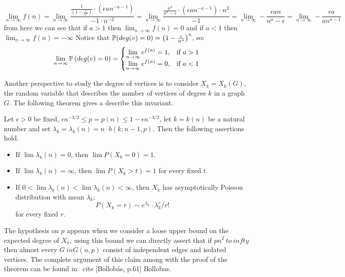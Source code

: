 $$\displaystyle\lim_{n\to \infty } f(n) = 
\displaystyle\lim_{n\to \infty } \frac{\frac{1}{\left( 1 - \frac{\epsilon}{n^a}\right)}\cdot (\epsilon a n^{-a-1})}
{-1\cdot n^{-2}} = 
\displaystyle\lim_{n\to \infty } \frac{\frac{n^a}{n^{a} - \epsilon}\cdot (\epsilon a n^{-a-1}) \cdot {n^{2}}}{-1} = 
\displaystyle\lim_{n\to \infty } - \frac{\epsilon a n}{n^{a} - \epsilon} =
\displaystyle\lim_{n\to \infty } - \frac{\epsilon a}{a n^{a-1}}
$$
from here we can see that if $a>1$ then $\displaystyle\lim_{n\to \infty } f(n) = 0$ and if $a<1$  then $\displaystyle\lim_{n\to \infty } f(n) = -\infty$
Notice that $\P(deg(v)=0) = \left(1 - \frac{\epsilon}{n^a} \right)^n$, so:
$$ \displaystyle\lim_{n\to \infty} \P\left(deg(v)=0\right) = \begin{cases} 
\displaystyle\lim_{n\to \infty}e^{f(n)} = 1, & \mbox{if } a>1 \\ 
\displaystyle\lim_{n\to \infty}e^{f(n)} = 0, & \mbox{if } a<1 \end{cases} $$

Another perspective to study the degree of vertices is to consider $X_{k} = X_{k} (G)$, the random variable that describes the number of vertices of degree $k$ in a graph $G$. The following theorem gives a describe this invariant.

\begin{theorem}
Let $\epsilon>0$ be fixed, $\epsilon n^{-3/2} \leq p = p(n) \leq 1 - \epsilon n^{-3/2}$, let $k = k(n)$ be a natural number and set $\lambda_{k} = \lambda_{k}(n) = n\cdot b(k;n - 1,p)$. Then the following assertions hold.

\begin{itemize}
\item If $\lim \lambda_{k}(n) = 0$, then $\lim P(X_{k} = 0) = 1$. 
\item If $\lim \lambda_{k}(n) = \infty$, then $\lim P(X_{k} > t) = 1$
for every fixed $t$.
\item If $0 < \lim\lambda_{k}(n) < \lim \lambda_{k}(n) < \infty$,
then $X_{k}$ has asymptotically Poisson distribution with mean $\lambda_{k}$: 
$$P(X_{k} = r) \sim e^{\lambda_{k}}\cdot \lambda_{k}^{r}/ r!$$
for every fixed $r$.
\end{itemize}
\end{theorem}

The hypothesis on $ p $ appears when we consider a loose upper bound on the expected degree of $ X_ {k} $, using this bound we can directly assert that if $ pn ^ {2} \ to \ infty $ then almost every $ G \ in G (n, p) $ consist of independent edges and isolated vertices. The complete argument of this claim among with the proof of the theorem can be found in \ cite [Bollobás, p.61] {Bollobas}.

